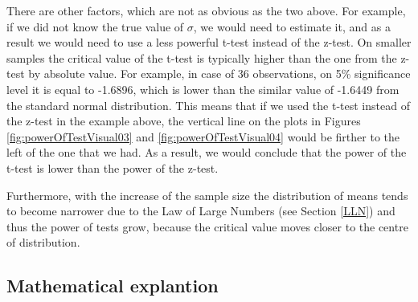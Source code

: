 \documentclass[
]{book}
\theoremstyle{definition}
\theoremstyle{definition}
\theoremstyle{definition}
\theoremstyle{definition}
\theoremstyle{remark}
\begin{document}
There are other factors, which are not as obvious as the two above. For example, if we did not know the true value of \(\sigma\), we would need to estimate it, and as a result we would need to use a less powerful t-test instead of the z-test. On smaller samples the critical value of the t-test is typically higher than the one from the z-test by absolute value. For example, in case of 36 observations, on 5\% significance level it is equal to -1.6896, which is lower than the similar value of -1.6449 from the standard normal distribution. This means that if we used the t-test instead of the z-test in the example above, the vertical line on the plots in Figures \ref{fig:powerOfTestVisual03} and \ref{fig:powerOfTestVisual04} would be firther to the left of the one that we had. As a result, we would conclude that the power of the t-test is lower than the power of the z-test.

Furthermore, with the increase of the sample size the distribution of means tends to become narrower due to the Law of Large Numbers (see Section \ref{LLN}) and thus the power of tests grow, because the critical value moves closer to the centre of distribution.

\hypertarget{PowerMathematical}{%
\subsection{Mathematical explantion}\label{PowerMathematical}}
\end{document}
